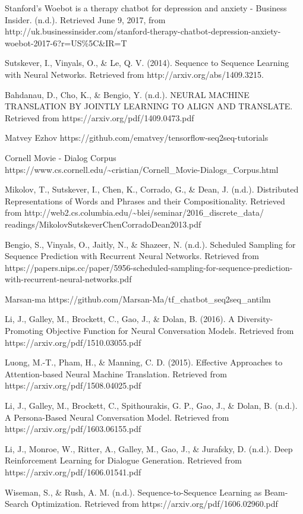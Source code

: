 \documentclass[%
 reprint,
 amsmath,amssymb,
 aps,
]{revtex4-1}
\begin{document}
\begin{thebibliography}{9}

Stanford’s Woebot is a therapy chatbot for depression and anxiety - Business Insider. (n.d.). Retrieved June 9, 2017, from http://uk.businessinsider.com/stanford-therapy-chatbot-depression-anxiety-woebot-2017-6?r=US\%5C\&IR=T
 
Sutskever, I., Vinyals, O., \& Le, Q. V. (2014). Sequence to Sequence Learning with Neural Networks. Retrieved from http://arxiv.org/abs/1409.3215.

Bahdanau, D., Cho, K., \& Bengio, Y. (n.d.). NEURAL MACHINE TRANSLATION BY JOINTLY LEARNING TO ALIGN AND TRANSLATE. Retrieved from https://arxiv.org/pdf/1409.0473.pdf

Matvey Ezhov
https://github.com/ematvey/tensorflow-seq2seq-tutorials

Cornell Movie - Dialog Corpus
https://www.cs.cornell.edu/\~{}cristian/Cornell\_Movie-Dialogs\_Corpus.html

Mikolov, T., Sutskever, I., Chen, K., Corrado, G., \& Dean, J. (n.d.). Distributed Representations of Words and Phrases and their Compositionality. Retrieved from http://web2.cs.columbia.edu/\~{}blei/seminar/2016\_discrete\_data/ \\
readings/MikolovSutskeverChenCorradoDean2013.pdf

Bengio, S., Vinyals, O., Jaitly, N., \& Shazeer, N. (n.d.). Scheduled Sampling for Sequence Prediction with Recurrent Neural Networks. Retrieved from https://papers.nips.cc/paper/5956-scheduled-sampling-for-sequence-prediction-with-recurrent-neural-networks.pdf

Marsan-ma
https://github.com/Marsan-Ma/tf\_chatbot\_seq2seq\_antilm

Li, J., Galley, M., Brockett, C., Gao, J., \& Dolan, B. (2016). A Diversity-Promoting Objective Function for Neural Conversation Models. Retrieved from https://arxiv.org/pdf/1510.03055.pdf

Luong, M.-T., Pham, H., \& Manning, C. D. (2015). Effective Approaches to Attention-based Neural Machine Translation. Retrieved from https://arxiv.org/pdf/1508.04025.pdf

Li, J., Galley, M., Brockett, C., Spithourakis, G. P., Gao, J., \& Dolan, B. (n.d.). A Persona-Based Neural Conversation Model. Retrieved from https://arxiv.org/pdf/1603.06155.pdf

Li, J., Monroe, W., Ritter, A., Galley, M., Gao, J., \& Jurafsky, D. (n.d.). Deep Reinforcement Learning for Dialogue Generation. Retrieved from https://arxiv.org/pdf/1606.01541.pdf

Wiseman, S., \& Rush, A. M. (n.d.). Sequence-to-Sequence Learning as Beam-Search Optimization. Retrieved from https://arxiv.org/pdf/1606.02960.pdf

\end{thebibliography}
\end{document}
